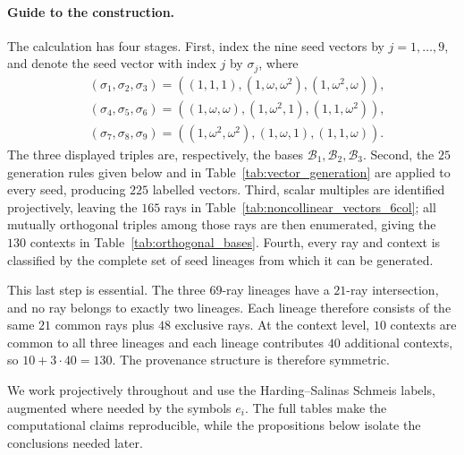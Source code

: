 \documentclass[%
  reprint,
  superscriptaddress,
  showkeys,
  amsmath,amssymb,
  aps,pra,
  longbibliography,
  floatfix,
  x11names
]{revtex4-2}
\begin{document}
\paragraph*{Guide to the construction.}
The calculation has four stages.
First, index the nine seed vectors
by $j=1,\ldots,9$, and denote
the seed vector with index $j$ by
$\sigma_j$, where
\[
\begin{aligned}
&\ensuremath{(\sigma_1,\sigma_2,\sigma_3)=((1,1,1),(1,\omega,\omega^2),(1,\omega^2,\omega))},\\
&\ensuremath{(\sigma_4,\sigma_5,\sigma_6)=((1,\omega,\omega),(1,\omega^2,1),(1,1,\omega^2))},\\
&\ensuremath{(\sigma_7,\sigma_8,\sigma_9)=((1,\omega^2,\omega^2),(1,\omega,1),(1,1,\omega))}.
\end{aligned}
\]
The three displayed triples are, respectively, the bases \(\mathcal B_1,\mathcal B_2,\mathcal B_3\).
Second, the $25$ generation rules given below and in Table~\ref{tab:vector_generation} are applied to every seed, producing $225$ labelled vectors.  Third, scalar multiples are identified projectively, leaving the $165$ rays in Table~\ref{tab:noncollinear_vectors_6col}; all mutually orthogonal triples among those rays are then enumerated, giving the $130$ contexts in Table~\ref{tab:orthogonal_bases}.  Fourth, every ray and context is classified by the complete set of seed lineages from which it can be generated.

This last step is essential.  The three $69$-ray lineages have a $21$-ray intersection, and no ray belongs to exactly two lineages.  Each lineage therefore consists of the same $21$ common rays plus $48$ exclusive rays.  At the context level, $10$ contexts are common to all three lineages and each lineage contributes $40$ additional contexts, so $10+3\cdot40=130$.  The provenance structure is therefore symmetric.

We work projectively throughout and use the Harding--Salinas Schmeis labels, augmented where needed by the symbols $e_i$.  The full tables make the computational claims reproducible, while the propositions below isolate the conclusions needed later.
\end{document}
